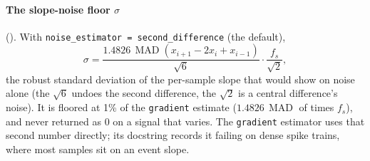 \paragraph{The slope-noise floor $\sigma$} (). With
\texttt{noise\_estimator = second\_difference} (the default),
\[
\sigma = \frac{1.4826\,\operatorname{MAD}(x_{i+1}-2x_i+x_{i-1})}{\sqrt6}\cdot\frac{f_s}{\sqrt2},
\]
the robust standard deviation of the per-sample slope that  would show on
noise alone (the $\sqrt6$ undoes the second difference, the $\sqrt2$ is a central
difference's noise). It is floored at 1\% of the \texttt{gradient} estimate
($1.4826\,\operatorname{MAD}$ of  times $f_s$), and never returned as 0
on a signal that varies. The \texttt{gradient} estimator uses that second number directly; its
docstring records it failing on dense spike trains, where most samples sit on an event slope.

